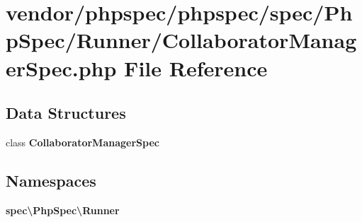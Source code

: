 \section{vendor/phpspec/phpspec/spec/\+Php\+Spec/\+Runner/\+Collaborator\+Manager\+Spec.php File Reference}
\label{_collaborator_manager_spec_8php}
\subsection*{Data Structures}
\begin{DoxyCompactItemize}
\item 
class {\bf Collaborator\+Manager\+Spec}
\end{DoxyCompactItemize}
\subsection*{Namespaces}
\begin{DoxyCompactItemize}
\item 
 {\bf spec\textbackslash{}\+Php\+Spec\textbackslash{}\+Runner}
\end{DoxyCompactItemize}
